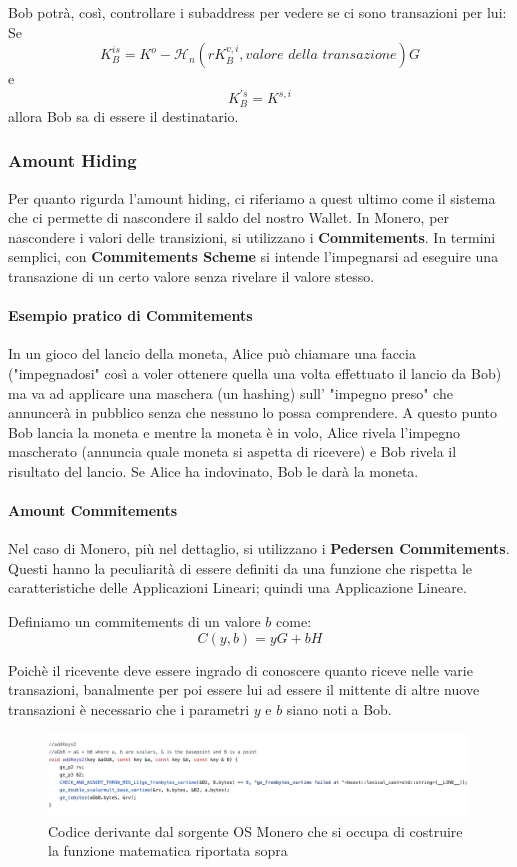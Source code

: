 \documentclass[12pt,a4paper]{article}
\begin{document}
Bob potrà, così, controllare i subaddress per vedere se ci sono transazioni per
lui: Se 
$$ K^{is}_B = K^o - \mathcal{H}_n(rK^{v,i}_B, \textit{valore della
transazione})G $$ e $$ K^{'s}_B = K^{s,i} $$ allora Bob sa di essere il
destinatario.

\subsubsection*{Amount Hiding}
Per quanto rigurda l'amount hiding, ci riferiamo a quest ultimo come il sistema
che ci permette di nascondere il saldo del nostro Wallet. In Monero, per nascondere i valori delle transizioni, si utilizzano i \textbf{Commitements}. 
In termini semplici, con \textbf{Commitements Scheme} si intende l'impegnarsi 
ad eseguire una transazione di un certo valore senza rivelare il valore stesso.

\paragraph{Esempio pratico di Commitements}

In un gioco del lancio della moneta, Alice può chiamare una faccia
("impegnadosi" così a voler ottenere quella una volta effettuato il lancio da Bob) ma va ad applicare una maschera (un hashing) sull' "impegno preso" che annuncerà in pubblico senza che nessuno lo possa comprendere. A questo punto Bob lancia la moneta e mentre la moneta è in volo, Alice rivela l'impegno mascherato (annuncia quale moneta si aspetta di ricevere) e Bob rivela il risultato del lancio. Se Alice ha indovinato, Bob le darà la moneta.

\paragraph{Amount Commitements} Nel caso di Monero, più nel dettaglio, si utilizzano i \textbf{Pedersen Commitements}. Questi hanno la peculiarità di essere definiti da una funzione che rispetta le caratteristiche delle Applicazioni Lineari; quindi una Applicazione Lineare.

Definiamo un commitements di un valore $ b $ come:
$$ C(y, b) = yG + bH $$

Poichè il ricevente deve essere ingrado di conoscere quanto riceve nelle varie transazioni, banalmente per poi essere lui ad essere il mittente di altre nuove transazioni è necessario che i parametri $ y $ e $ b $ siano noti a Bob. 

\begin{figure}[ht]
    \centering
    \includegraphics[width=0.99\textwidth]{./images/addKeys2.png}
    \caption{Codice derivante dal sorgente OS Monero che si occupa di costruire la funzione matematica riportata sopra}
    \label{fig:summary}
\end{figure}
\end{document}
